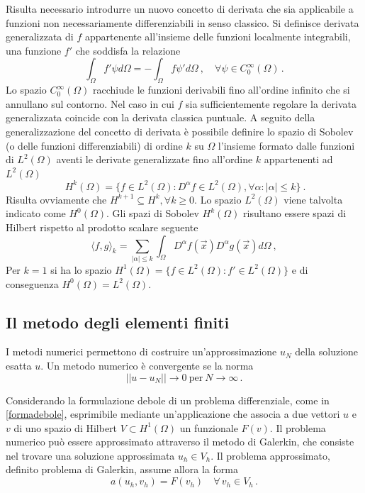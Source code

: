 Risulta necessario introdurre un nuovo concetto di derivata che sia
applicabile a funzioni non necessariamente differenziabili
in senso classico.
Si definisce derivata generalizzata di $f$ appartenente 
all'insieme delle funzioni localmente integrabili, una funzione $f'$ che soddisfa la relazione
\begin{equation}
\label{derivatageneralizzata}
\int_{\Omega}f'\psi d\Omega = - \int_{\Omega}f\psi' d\Omega \ , \quad \forall \psi
\in C_{0}^{\infty}(\Omega) \, .
\end{equation}
Lo spazio $ C_{0}^{\infty}(\Omega)$ racchiude le funzioni
derivabili fino all'ordine infinito che si annullano sul contorno.
Nel caso in cui $f$ sia sufficientemente regolare la 
derivata generalizzata coincide con la
derivata classica puntuale.
A seguito della generalizzazione del concetto di derivata
è possibile definire lo spazio di Sobolev 
(o delle funzioni differenziabili) di ordine $k$ su $\Omega$ 
l'insieme formato dalle funzioni di $L^{2}(\Omega)$  aventi 
le derivate generalizzate fino all'ordine $k$ appartenenti ad $L^{2}(\Omega)$
\begin{equation}
\ H^{k}(\Omega) = \{ f \in L^{2}(\Omega) : D^{\alpha}f \in  L^{2}(\Omega), \forall \alpha : |\alpha| \leq k \} \ .
\end{equation}
Risulta ovviamente che $H^{k+1} \subseteq H^{k}, \forall k \ge 0$.
Lo spazio $L^{2}(\Omega)$ viene talvolta indicato come 
$H^{0}(\Omega)$. Gli spazi di Sobolev $H^{k}(\Omega)$ risultano
essere spazi di Hilbert rispetto al prodotto scalare seguente
\begin{equation}
\langle f, g \rangle _{k}= \sum _{|\alpha| \leq k} 
\int_{\Omega}D^{\alpha}f(\vec{x})D^{\alpha}g(\vec{x})d\Omega \ ,
\end{equation}
Per $k=1$ si ha lo spazio $H^{1}(\Omega)=
\{ f \in L^{2}(\Omega) : f' \in  L^{2}(\Omega) \}$ e di conseguenza $H^0 (\Omega) = L^2 (\Omega)$.

\subsection{Il metodo degli elementi finiti}

I metodi numerici permettono di costruire un'approssimazione $u_{N}$ della soluzione esatta $u$.
Un metodo numerico è convergente se la norma 
\begin{equation}
 ||u-u_{N}||\rightarrow 0 \ \text{per} \ N\rightarrow \infty \,.
\end{equation}

Considerando la formulazione debole di un problema differenziale, 
come in \eqref{formadebole}, esprimibile mediante 
un'applicazione che associa a due vettori $u$ e $v$ di
uno spazio di Hilbert $V \subset H^{1}(\Omega)$ un funzionale $F(v)$.
Il problema numerico può essere approssimato attraverso il metodo di Galerkin, 
che consiste nel trovare una soluzione approssimata $u_{h} \in V_{h}$.
Il problema approssimato, definito problema di Galerkin, assume allora la forma
\begin{equation}
\label{galerkin}
 a(u_{h},v_{h})=F(v_{h})\quad \forall \, v_{h} \in V_{h} \, .
\end{equation}
 
